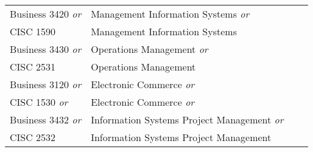 \documentclass{article}
\begin{document}
\begin{Form}
\begin{longtable}{ |p{2.8cm}|p{6cm}|p{4.8cm}|p{2.3cm}|  }
						Business 3420 \emph{or} & Management Information Systems \emph{or} &  \TextField[name=3420_instructor,width=4.8cm,charsize=8pt,bordercolor=1 1 1,borderstyle=U]{}    &  \TextField[name=3420_grade,width=2.2cm,charsize=8pt,bordercolor=1 1 1]{{}}     \\
						
						CISC 1590 & Management Information Systems &   \TextField[name=1590_instructor,width=4.8cm,charsize=8pt,bordercolor=1 1 1,borderstyle=U]{} &   \TextField[name=1590_grade,width=2.2cm,charsize=8pt,bordercolor=1 1 1]{{}}    \\
						\hline
						Business 3430 \emph{or} & Operations Management \emph{or} &  \TextField[name=3430_instructor,width=4.8cm,charsize=8pt,bordercolor=1 1 1,borderstyle=U]{}    &  \TextField[name=3430_grade,width=2.2cm,charsize=8pt,bordercolor=1 1 1]{{}}     \\
						
						CISC 2531 & Operations Management &   \TextField[name=2531_instructor,width=4.8cm,charsize=8pt,bordercolor=1 1 1,borderstyle=U]{} &   \TextField[name=2531_grade,width=2.2cm,charsize=8pt,bordercolor=1 1 1]{{}}    \\
						\hline
						
						Business 3120 \emph{or} & Electronic Commerce \emph{or} &  \TextField[name=3120_instructor,width=4.8cm,charsize=8pt,bordercolor=1 1 1,borderstyle=U]{}    &  \TextField[name=3120_grade,width=2.2cm,charsize=8pt,bordercolor=1 1 1]{{}}     \\
						
						CISC 1530 \emph{or}& Electronic Commerce \emph{or} &   \TextField[name=1530_instructor,width=4.8cm,charsize=8pt,bordercolor=1 1 1,borderstyle=U]{} &   \TextField[name=1530_grade,width=2.2cm,charsize=8pt,bordercolor=1 1 1]{{}}    \\
						
						Business 3432 \emph{or} & Information Systems Project Management \emph{or} &  \TextField[name=3432_instructor,width=4.8cm,charsize=8pt,bordercolor=1 1 1,borderstyle=U]{}    &  \TextField[name=3432_grade,width=2.2cm,charsize=8pt,bordercolor=1 1 1]{{}}     \\
						
						CISC 2532 & Information Systems Project Management &   \TextField[name=2532_instructor,width=4.8cm,charsize=8pt,bordercolor=1 1 1,borderstyle=U]{} &   \TextField[name=2532_grade,width=2.2cm,charsize=8pt,bordercolor=1 1 1]{{}}    \\
						\hline
						

\end{longtable}
\end{Form}
\end{document}
